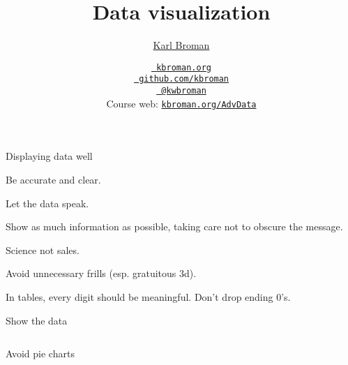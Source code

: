 \documentclass[aspectratio=169,12pt,t]{beamer}
\title{Data visualization}
\author{\href{https://kbroman.org}{Karl Broman}}
\institute{Biostatistics \& Medical Informatics, UW{\textendash}Madison}
\date{\href{https://kbroman.org}{\tt \scriptsize \color{foreground} kbroman.org}
\\[-4pt]
\href{https://github.com/kbroman}{\tt \scriptsize \color{foreground} github.com/kbroman}
\\[-4pt]
\href{https://twitter.com/kwbroman}{\tt \scriptsize \color{foreground} @kwbroman}
\\[-4pt]
{\scriptsize Course web: \href{https://kbroman.org/AdvData}{\tt kbroman.org/AdvData}}
}
\begin{document}
{
\frame{
  \titlepage

\note{
}
} }


\begin{frame}{Displaying data well}

\bbi
\item Be accurate and clear.

\item Let the data speak.

\bi
\item Show as much information as possible, taking care not to
  obscure the message.
\ei

\item Science not sales.

\bi
\item Avoid unnecessary frills (esp. gratuitous 3d).
\ei

\item In tables, every digit should be meaningful. Don't drop ending 0's.
\ei

\note{
}
\end{frame}




\begin{frame}[c]{Show the data}

\begin{columns}






\end{columns}

\note{

}

\end{frame}




\begin{frame}[c]{Avoid pie charts}


\begin{columns}





\end{columns}

\note{

}
\end{frame}
\end{document}
